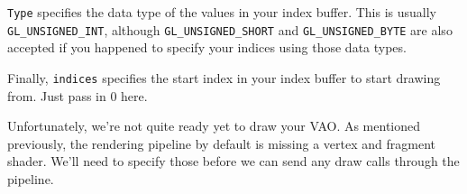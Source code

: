 \texttt{Type} specifies the data type of the values in your index buffer. This is usually \texttt{GL_UNSIGNED_INT}, although \texttt{GL_UNSIGNED_SHORT} and \texttt{GL_UNSIGNED_BYTE} are also accepted if you happened to specify your indices using those data types.

Finally, \texttt{indices} specifies the start index in your index buffer to start drawing from. Just pass in 0 here.

Unfortunately, we're not quite ready yet to draw your VAO. As mentioned previously, the rendering pipeline by default is missing a vertex and fragment shader. We'll need to specify those before we can send any draw calls through the pipeline.
